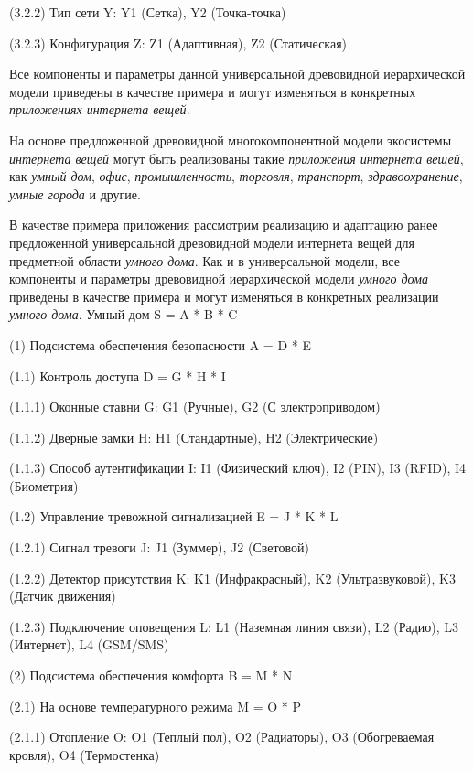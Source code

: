 (3.2.2) Тип сети Y: Y1 (Сетка), Y2 (Точка-точка)

(3.2.3) Конфигурация Z: Z1 (Адаптивная), Z2 (Статическая)

Все компоненты и параметры данной универсальной древовидной иерархической модели приведены в качестве примера и могут изменяться в конкретных \textit{приложениях интернета вещей}.

На основе предложенной древовидной многокомпонентной модели экосистемы \textit{интернета вещей} могут быть реализованы такие \textit{приложения интернета вещей}, как \textit{умный дом}, \textit{офис}, \textit{промышленность}, \textit{торговля}, \textit{транспорт}, \textit{здравоохранение}, \textit{умные города} и другие.

В качестве примера приложения рассмотрим реализацию и адаптацию ранее предложенной универсальной древовидной модели интернета вещей для предметной области \textit{умного дома}. Как и в универсальной модели, все компоненты и параметры древовидной иерархической модели \textit{умного дома} приведены в качестве примера и могут изменяться в конкретных реализации \textit{умного дома}.
Умный дом S = A * B * C

(1) Подсистема обеспечения безопасности A = D * E

(1.1) Контроль доступа D = G * H * I

(1.1.1) Оконные ставни G: G1 (Ручные), G2 (С электроприводом)

(1.1.2) Дверные замки H: H1 (Стандартные), H2 (Электрические)

(1.1.3) Способ аутентификации I: I1 (Физический ключ), I2 (PIN), I3 (RFID), I4 (Биометрия)

(1.2) Управление тревожной сигнализацией E = J * K * L

(1.2.1) Сигнал тревоги J: J1 (Зуммер), J2 (Световой)

(1.2.2) Детектор присутствия K: K1 (Инфракрасный), K2 (Ультразвуковой), K3 (Датчик движения)

(1.2.3) Подключение оповещения L: L1 (Наземная линия связи), L2 (Радио), L3 (Интернет), L4 (GSM/SMS)

(2) Подсистема обеспечения комфорта B = M * N

(2.1) На основе температурного режима M = O * P

(2.1.1) Отопление O: O1 (Теплый пол), O2 (Радиаторы), O3 (Обогреваемая кровля), O4 (Термостенка)

